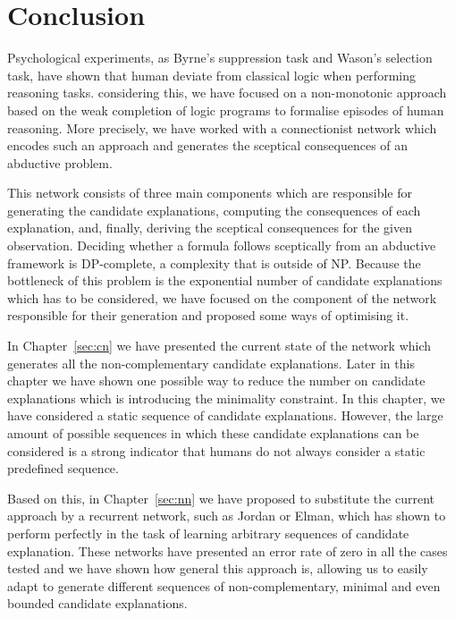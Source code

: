 
\chapter{Conclusion}
\label{sec:conclusion}

Psychological experiments, as Byrne's suppression task and Wason's selection task, have shown that human deviate from classical logic when performing reasoning tasks. considering this, we have focused on a non-monotonic approach based on the weak completion of logic programs to formalise episodes of human reasoning. More precisely, we have worked with a connectionist network which encodes such an approach and generates the sceptical consequences of an abductive problem.

This network consists of three main components which are responsible for generating the candidate explanations, computing the consequences of each explanation, and, finally, deriving the sceptical consequences for the given observation. Deciding whether a formula follows sceptically from an abductive framework is DP-complete, a complexity that is outside of NP. Because the bottleneck of this problem is the exponential number of candidate explanations which has to be considered, we have focused on the component of the network responsible for their generation and proposed some ways of optimising it.

In Chapter~\ref{sec:cn} we have presented the current state of the network which generates all the non-complementary candidate explanations. Later in this chapter we have shown one possible way to reduce the number on candidate explanations which is introducing the minimality constraint. In this chapter, we have considered a static sequence of candidate explanations. However, the large amount of possible sequences in which these candidate explanations can be considered is a strong indicator that humans do not always consider a static predefined sequence.

Based on this, in Chapter~\ref{sec:nn} we have proposed to substitute the current approach by a recurrent network, such as Jordan or Elman, which has shown to perform perfectly in the task of learning arbitrary sequences of candidate explanation. These networks have presented an error rate of zero in all the cases tested and we have shown how general this approach is, allowing us to easily adapt to generate different sequences of non-complementary, minimal and even bounded candidate explanations.

